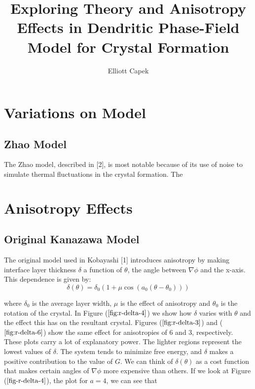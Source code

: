 \documentclass[10pt]{article} %
\title{Exploring Theory and Anisotropy Effects in Dendritic Phase-Field Model for Crystal Formation}
\author{Elliott Capek}
\begin{document}
\maketitle{}

\section{Variations on Model}
\subsection*{Zhao Model}
The Zhao model, described in [2], is most notable because of its use of noise to simulate thermal fluctuations in the crystal formation. The

\section{Anisotropy Effects}
\subsection*{Original Kanazawa Model}
The original model used in Kobayashi [1] introduces anisotropy by making interface layer thickness $\delta$ a function of $\theta$, the angle between $\nabla\phi$ and the x-axis. This dependence is given by:\\

\begin{equation*}
  \delta(\theta) = \delta_0(1 + \mu\cos(a_0(\theta-\theta_0)))
\end{equation*}

where $\delta_0$ is the average layer width, $\mu$ is the effect of anisotropy and $\theta_0$ is the rotation of the crystal. In Figure ($\ref{fig:r-delta-4}$) we show how $\delta$ varies with $\theta$ and the effect this has on the resultant crystal. Figures ($\ref{fig:r-delta-3}$) and ($\ref{fig:r-delta-6}$) show the same effect for anisotropies of $6$ and $3$, respectively.\\

These plots carry a lot of explanatory power. The lighter regions represent the lowest values of $\delta$. The system tends to minimize free energy, and $\delta$ makes a positive contribution to the value of $G$. We can think of $\delta(\theta)$ as a cost function that makes certain angles of $\nabla\phi$ more expensive than others. If we look at Figure ($\ref{fig-r-delta-4}$), the plot for $a=4$, we can see that 
\end{document}
